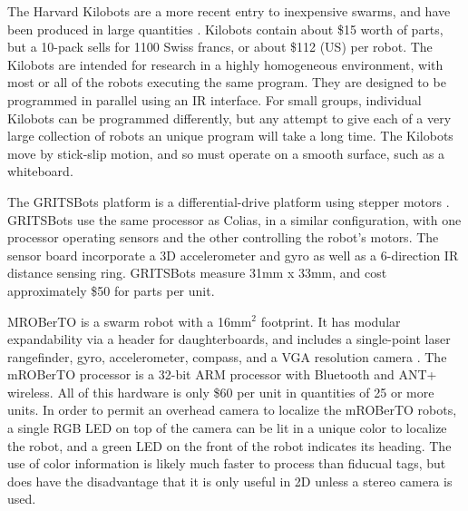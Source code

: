 \documentclass[]{article}
\begin{document}
The Harvard Kilobots are a more recent entry to inexpensive swarms, and have been produced in large quantities \cite{rubenstein2014kilobot}. 
Kilobots contain about \$15 worth of parts, but a 10-pack sells for 1100 Swiss francs, or about \$112 (US) per robot. 
The Kilobots are intended for research in a highly homogeneous environment, with most or all of the robots executing the same program. 
They are designed to be programmed in parallel using an IR interface. 
For small groups, individual Kilobots can be programmed differently, but any attempt to give each of a very large collection of robots an unique program will take a long time. 
The Kilobots move by stick-slip motion, and so must operate on a smooth surface, such as a whiteboard. 

The GRITSBots platform is a differential-drive platform using stepper motors \cite{pickem2015gritsbot}.
GRITSBots use the same processor as Colias, in a similar configuration, with one processor operating sensors and the other controlling the robot's motors. 
The sensor board incorporate a 3D accelerometer and gyro as well as a 6-direction IR distance sensing ring. 
GRITSBots measure 31mm x 33mm, and cost approximately \$50 for parts per unit. 

MROBerTO is a swarm robot with a 16mm$^2$ footprint. It has modular expandability via a header for daughterboards, and includes a single-point laser rangefinder, gyro, accelerometer, compass, and a VGA resolution camera \cite{Kim2016mROBerTOAM}. 
The mROBerTO processor is a 32-bit ARM processor with Bluetooth and ANT+ wireless. 
All of this hardware is only \$60 per unit in quantities of 25 or more units. 
In order to permit an overhead camera to localize the mROBerTO robots, a single RGB LED on top of the camera can be lit in a unique color to localize the robot, and a green LED on the front of the robot indicates its heading. 
The use of color information is likely much faster to process than fiducual tags, but does have the disadvantage that it is only useful in 2D unless a stereo camera is used. 
\end{document}
